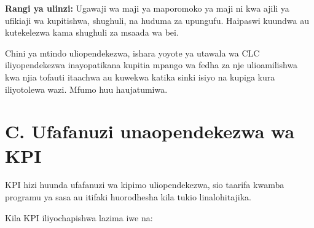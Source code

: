 \documentclass[11pt]{article}
\begin{document}
\textbf{Rangi ya ulinzi:} Ugawaji wa maji ya maporomoko ya maji ni kwa ajili ya ufikiaji wa kupitishwa, shughuli, na huduma za upungufu. Haipaswi kuundwa au kutekelezwa kama shughuli za msaada wa bei.

Chini ya mtindo uliopendekezwa, ishara yoyote ya utawala wa CLC iliyopendekezwa inayopatikana kupitia mpango wa fedha za nje ulioamilishwa kwa njia tofauti itaachwa au kuwekwa katika sinki isiyo na kupiga kura iliyotolewa wazi. Mfumo huu haujatumiwa.


\section*{C. Ufafanuzi unaopendekezwa wa KPI}

KPI hizi huunda ufafanuzi wa kipimo uliopendekezwa, sio taarifa kwamba programu ya sasa au itifaki huorodhesha kila tukio linalohitajika.

Kila KPI iliyochapishwa lazima iwe na:
\end{document}
